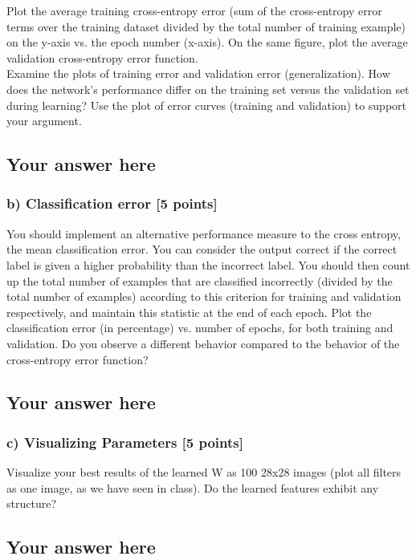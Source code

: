 \documentclass{article}
\begin{document}
Plot the average training cross-entropy error (sum of 
the cross-entropy error terms over the training dataset  divided by the total number 
of training example) on the y-axis vs. the epoch number (x-axis). 
On the same figure, plot the average validation cross-entropy error function.
\\
 
Examine the plots of training error and validation error (generalization).
How does the network's performance differ on the training set versus the validation set
during learning? Use the plot of error curves (training and validation) to support your argument.


\subsection*{Your answer here}

\subsubsection*{b) Classification error [5 points]}

You should implement an alternative performance measure to the cross entropy, the mean
classification error. You can
consider the output correct if the correct label is given a higher probability
than the incorrect label. You should then count up the total number of
examples that are classified incorrectly (divided by the total number of examples) 
according to this criterion for
training and validation respectively, and maintain this statistic at the end of
each epoch. Plot the classification error (in percentage)  vs. number of epochs, for both
training and validation.
Do you observe a different behavior compared to the behavior of the cross-entropy 
error function? 

\subsection*{Your answer here}

\subsubsection*{c) Visualizing Parameters [5 points]}
Visualize your best results of the learned W as 100 28x28 images 
(plot all filters as one image, as we have seen in class). 
Do the learned features exhibit any structure?

\subsection*{Your answer here}
\end{document}
